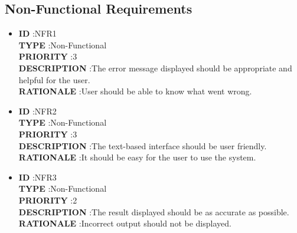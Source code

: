 \documentclass[a4paper,12pt]{article}
\begin{document}
\subsection{Non-Functional Requirements}
\begin{itemize}
	
	\item \textbf{ID } \hspace{3cm} :NFR1  \\
	\textbf{TYPE } \hspace{2.27cm}  :Non-Functional\\
	\textbf{PRIORITY } \hspace{1.15cm} :3 \\
	\textbf{DESCRIPTION }\hspace{0.35cm} :The error message displayed should be appropriate and helpful for the user. \\
	\textbf{RATIONALE } \hspace{0.75cm} :User should be able to know what went wrong.  \\
	
	
	\item \textbf{ID } \hspace{3cm} :NFR2  \\
	\textbf{TYPE } \hspace{2.27cm}  :Non-Functional\\
	\textbf{PRIORITY } \hspace{1.15cm} :3 \\
	\textbf{DESCRIPTION }\hspace{0.35cm} :The text-based interface should be user friendly. \\
	\textbf{RATIONALE } \hspace{0.75cm} :It should be easy for the user to use the system.  \\
	
	
	\item \textbf{ID } \hspace{3cm} :NFR3  \\
	\textbf{TYPE } \hspace{2.27cm}  :Non-Functional\\
	\textbf{PRIORITY } \hspace{1.15cm} :2 \\
	\textbf{DESCRIPTION }\hspace{0.35cm} :The result displayed should be as accurate as possible. \\
	\textbf{RATIONALE } \hspace{0.75cm} :Incorrect output should not be displayed.   \\
	

\end{itemize}
\end{document}
